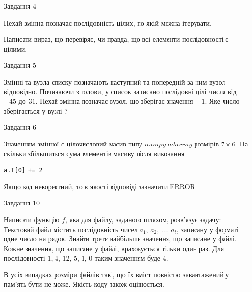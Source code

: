 \documentclass[12pt, ukrainian]{article}
\begin{document}
{               
{\begin{center}Завдання {4}\end{center}}
\vspace{-6mm}
Нехай змінна  позначає послідовність цілих, по якій можна ітерувати.

Написати вираз, що перевіряє, чи правда, що всі елементи послідовності є цілими.\par

\vspace{10mm}
               
{\begin{center}Завдання {5}\end{center}}
\vspace{-6mm}
Змінні  та  вузла списку позначають наступний та попередній за ним вузол відповідно. Починаючи з голови, у список записано послідовні цілі числа від~$-45$ до~$31$. Нехай змінна  позначає вузол, що зберігає значення~$-1$.
Яке число зберігається у вузлі  ?\par

               
{\begin{center}Завдання {6}\end{center}}
\vspace{-6mm}
Значенням змінної  є цілочисловий масив типу $numpy.ndarray$ розмірів $7{\times}6$. На скільки збільшиться сума елементів масиву  після виконання
\begin{verbatim}
a.T[0] += 2
\end{verbatim}


Якщо код некоректний, то в якості відповіді зазначити ERROR.\par

               
{\begin{center}Завдання {10}\end{center}}
\vspace{-6mm}

Написати функцію $f$, яка для файлу, заданого шляхом, розв’язує задачу:\\ Текстовий файл містить послідовність чисел $a_1$, $a_2$, $\ldots$, $a_t$, записану у форматі одне число на рядок. Знайти третє найбільше значення, що записане у файлі. Кожне значення, що записане у файлі, враховується тільки один раз. Для послідовності 1, 4, 12, 5, 1, 0 таким значенням буде 4.

В усіх випадках розміри файлів такі, що їх вміст повністю завантажений у пам'ять бути не може. Якість коду також оцінюється.



}
\end{document}
